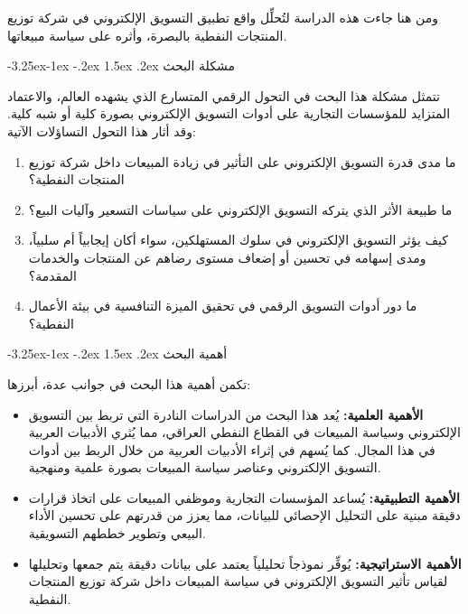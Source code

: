 \documentclass[12pt, a4paper]{report}
\makeatletter
\renewcommand\subsection{\@startsection{subsection}{2}{\z@}%
  {-3.25ex\@plus -1ex \@minus -.2ex}%
  {1.5ex \@plus .2ex}%
  {\normalfont\large\bfseries\color{sectiongray}}}
\makeatother
\begin{document}
ومن هنا جاءت هذه الدراسة لتُحلِّل واقع تطبيق التسويق الإلكتروني في شركة توزيع المنتجات النفطية بالبصرة، وأثره على سياسة مبيعاتها.

\subsection{مشكلة البحث}

تتمثل مشكلة هذا البحث في التحول الرقمي المتسارع الذي يشهده العالم، والاعتماد المتزايد للمؤسسات التجارية على أدوات التسويق الإلكتروني بصورة كلية أو شبه كلية. وقد أثار هذا التحول التساؤلات الآتية:

\begin{enumerate}[label=\arabic*.]
  \item ما مدى قدرة التسويق الإلكتروني على التأثير في زيادة المبيعات داخل شركة توزيع المنتجات النفطية؟
  \item ما طبيعة الأثر الذي يتركه التسويق الإلكتروني على سياسات التسعير وآليات البيع؟
  \item كيف يؤثر التسويق الإلكتروني في سلوك المستهلكين، سواء أكان إيجابياً أم سلبياً، ومدى إسهامه في تحسين أو إضعاف مستوى رضاهم عن المنتجات والخدمات المقدمة؟
  \item ما دور أدوات التسويق الرقمي في تحقيق الميزة التنافسية في بيئة الأعمال النفطية؟
\end{enumerate}

\subsection{أهمية البحث}

تكمن أهمية هذا البحث في جوانب عدة، أبرزها:

\begin{itemize}
  \item \textbf{الأهمية العلمية:} يُعد هذا البحث من الدراسات النادرة التي تربط بين التسويق الإلكتروني وسياسة المبيعات في القطاع النفطي العراقي، مما يُثري الأدبيات العربية في هذا المجال. كما يُسهم في إثراء الأدبيات العربية من خلال الربط بين أدوات التسويق الإلكتروني وعناصر سياسة المبيعات بصورة علمية ومنهجية.
  \item \textbf{الأهمية التطبيقية:} يُساعد المؤسسات التجارية وموظفي المبيعات على اتخاذ قرارات دقيقة مبنية على التحليل الإحصائي للبيانات، مما يعزز من قدرتهم على تحسين الأداء البيعي وتطوير خططهم التسويقية.
  \item \textbf{الأهمية الاستراتيجية:} يُوفِّر نموذجاً تحليلياً يعتمد على بيانات دقيقة يتم جمعها وتحليلها لقياس تأثير التسويق الإلكتروني في سياسة المبيعات داخل شركة توزيع المنتجات النفطية.
\end{itemize}
\end{document}
